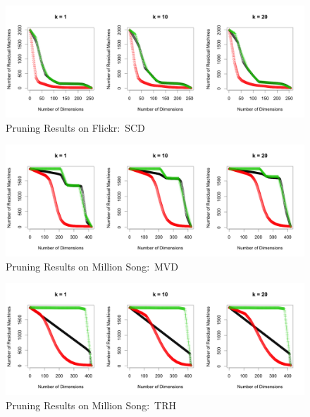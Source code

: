 \begin{figure}[htpb!]
  \centering
  \includegraphics[width=1.0\linewidth]{exp/prune/f3.png}
  \caption{Pruning Results on Flickr:~SCD}
  \label{fig:prune_f3}
\end{figure}

\begin{figure}[htpb!]
  \centering
  \includegraphics[width=1.0\linewidth]{exp/prune/mvd.png}
  \caption{Pruning Results on Million Song:~MVD}
  \label{fig:prune_mvd}
\end{figure}

\begin{figure}[htpb!]
  \centering
  \includegraphics[width=1.0\linewidth]{exp/prune/trh.png}
  \caption{Pruning Results on Million Song:~TRH}
  \label{fig:prune_trh}
\end{figure}





%
%